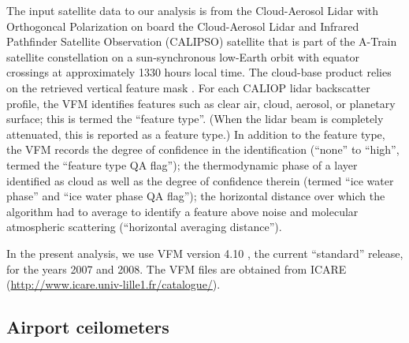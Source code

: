 \documentclass[essd,manuscript]{copernicus}\usepackage[]{graphicx}\usepackage[]{color}
\newcommand{\hlnum}[1]{\textcolor[rgb]{0.686,0.059,0.569}{#1}}%
\newcommand\comment[2]{\{\hlnum{ \textit{#1}: #2}\}}
\newcommand\commentjm[1]{\comment{$j_\mu$}{#1}}
\begin{document}
The input satellite data to our analysis is from the Cloud-Aerosol Lidar with
Orthogoncal Polarization \cite[CALIOP][]{Winker2007} on board the Cloud-Aerosol Lidar and Infrared Pathfinder
Satellite Observation (CALIPSO) satellite that is part of the A-Train
satellite constellation \citep{Stephens2002} on a
sun-synchronous low-Earth orbit with equator crossings at approximately 1330 hours local
time. The cloud-base product relies on the retrieved vertical feature mask
\citep[VFM,][]{vaughan2002}.  For each CALIOP lidar backscatter profile, the VFM identifies features
such as clear air, cloud, aerosol, or planetary surface; this is termed the ``feature
type''.  (When the lidar beam is completely attenuated, this is reported as a
feature type.)  In addition to the feature type, the VFM records the degree of
confidence in the identification (``none'' to ``high'', termed the ``feature
type QA flag''); the thermodynamic phase of a layer identified as cloud as well
as the degree of confidence therein (termed ``ice water phase'' and ``ice water
phase QA flag''); the horizontal distance over which the algorithm had to
average to identify a feature above noise and molecular atmospheric scattering
(``horizontal averaging distance'').  

In the present analysis, we use VFM version 4.10 \citep{vfm}, the current
``standard'' release, for the years 2007 and 2008.  The VFM files are obtained
from ICARE (\url{http://www.icare.univ-lille1.fr/catalogue/}).

\subsection{Airport ceilometers}
\end{document}
